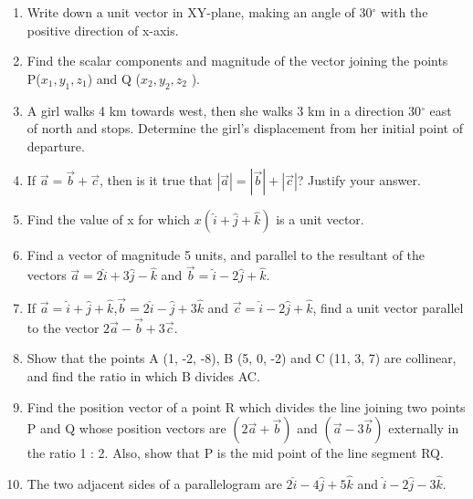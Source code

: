 \begin{enumerate}[label=\thesection.\arabic*,ref=\thesection.\theenumi]
\item Write down a unit vector in XY-plane, making an angle of 30$^{\circ}$ with the positive direction of x-axis.\\
\item Find the scalar components and magnitude of the vector joining the points P($x_1,y_1,z_1 $) and Q ($x_2,y_2,z_2$ ).\\
\item A girl walks 4 km towards west, then she walks 3 km in a direction 30$^{\circ}$ east of north and stops. Determine the girl's displacement from her initial point of departure.\\
	\solution
		
\item If $\vec{a}=\vec{b}+\vec{c}$, then is it true that $|\vec{a}|=|\vec{b}|+|\vec{c}|$? Justify your answer.\\
	\solution
		
\item Find the value of x for which $x(\hat{i}+\hat{j}+\hat{k})$ is a unit vector.\\
	\solution
		
\item Find a vector of magnitude 5 units, and parallel to the resultant of the vectors $\vec{a}=2\hat{i}+3\hat{j}-\hat{k}$ and $\vec{b}=\hat{i}-2\hat{j}+\hat{k}$.\\
\item If $\vec{a}=\hat{i}+\hat{j}+\hat{k}$,$\vec{b}=2\hat{i}-\hat{j}+3\hat{k}$ and $\vec{c}=\hat{i}-2\hat{j}+\hat{k}$, find a unit vector parallel to the vector $2\vec{a}-\vec{b}+3\vec{c}$.\\
	\solution
		
\item Show that the points A (1, -2, -8), B (5, 0, -2) and C (11, 3, 7) are collinear, and find the ratio in which B divides AC.\\
\item Find the position vector of a point R which divides the line joining two points P and Q whose position vectors are $(2\vec{a}+\vec{b})$ and $(\vec{a}-3\vec{b})$
externally in the ratio 1 : 2. Also, show that P is the mid point of the line segment RQ.\\
	\solution
%		
\item The two adjacent sides of a parallelogram are 
$2\hat{i}-4\hat{j}+5\hat{k}$  and  $\hat{i}-2\hat{j}-3\hat{k}$.

\end{enumerate}
